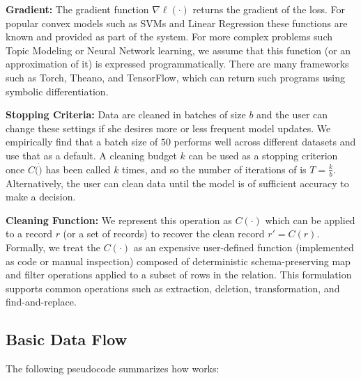 \vspace{0.25em}

\noindent\textbf{Gradient:} The gradient function $\nabla\ell(\cdot)$ returns the gradient of the loss. 
For popular convex models such as SVMs and Linear Regression these functions are known and provided as part of the system. 
For more complex problems such Topic Modeling or Neural Network learning, we assume that this function (or an approximation of it) is expressed programmatically. There are many frameworks such as Torch, Theano, and TensorFlow, which can return such programs using symbolic differentiation. 

\vspace{0.25em}

\noindent\textbf{Stopping Criteria: } Data are cleaned in batches of size $b$ and the user can change these settings if she desires more or less frequent model updates.
We empirically find that a batch size of $50$ performs well across different datasets and use that as a default.
A cleaning budget $k$ can be used as a stopping criterion once $C(\dot)$ has been called $k$ times, and so the number of iterations of \sys is $T = \frac{k}{b}$.
Alternatively, the user can clean data until the model is of sufficient accuracy to make a decision.

\vspace{0.25em}

\noindent\textbf{Cleaning Function: } We represent this operation as $C(\cdot)$ which can be applied to a record $r$ (or a set of records) to recover the clean record $r' = C(r)$.
Formally, we treat the $C(\cdot)$ as an expensive user-defined function (implemented as code or manual inspection) composed of deterministic schema-preserving \textsf{map} and \textsf{filter} operations applied to a subset of rows in the relation. 
This formulation supports common operations such as extraction, deletion, transformation, and find-and-replace.

\subsection{Basic Data Flow} \label{df}
The following pseudocode summarizes how \sys works:

